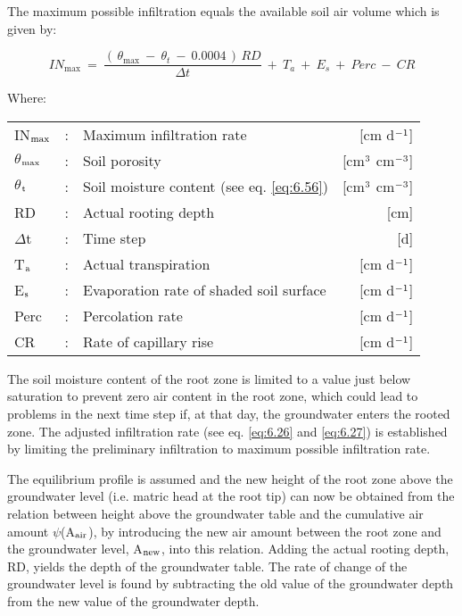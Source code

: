 The maximum possible infiltration equals the available soil air volume which is given by:

\begin{equation}
\label{eq:6.47}
IN_{\max } ~=~{\frac{(\, \theta _{\max } ~-~ \theta _{t} ~-~ 0.0004\, )\, RD}{\Delta t}} ~+~ T _{a} ~+~ E _{s} ~+~ Perc ~-~ CR
\end{equation}

Where:\\[5pt]
\begin{tabularx}{\textwidth}{llXr}
IN$_{{\rm max}}$ &:& Maximum infiltration rate  & [cm d$^{{\rm -1}}$]\\
$\theta$$_{{\rm max}}$ &:& Soil porosity  & [cm$^{{\rm 3}}$ cm$^{{\rm -3}}$]\\
$\theta$$_{{\rm t}}$ &:& Soil moisture content (see eq. \ref{eq:6.56})  
    & [cm$^{{\rm 3}}$ cm$^{{\rm -3}}$]\\
RD &:& Actual rooting depth  & [cm]\\
$\Delta$t &:& Time step  & [d]\\
T$_{{\rm a}}$ &:& Actual transpiration  & [cm d$^{{\rm -1}}$]\\
E$_{{\rm s}}$ &:& Evaporation rate of shaded soil surface  & [cm d$^{{\rm -1}}$]\\
Perc &:& Percolation rate  & [cm d$^{{\rm -1}}$]\\
CR &:& Rate of capillary rise  & [cm d$^{{\rm -1}}$]\\
\end{tabularx}

The soil moisture content of the root zone is limited to a value just below saturation to
prevent zero air content in the root zone, which could lead to problems in the next time
step if, at that day, the groundwater enters the rooted zone. The adjusted infiltration rate
(see eq. \ref{eq:6.26} and \ref{eq:6.27}) is established by limiting the preliminary infiltration to maximum
possible infiltration rate.

The equilibrium profile is assumed and the new height of the root zone above the
groundwater level (i.e. matric head at the root tip) can now be obtained from the relation
between height above the groundwater table and the cumulative air amount $\psi$(A$_{{\rm air}}$), by
introducing the new air amount between the root zone and the groundwater level, A$_{{\rm new}}$,
into this relation. Adding the actual rooting depth, RD, yields the depth of the groundwater 
table. The rate of change of the groundwater level is found by subtracting the old
value of the groundwater depth from the new value of the groundwater depth. 


